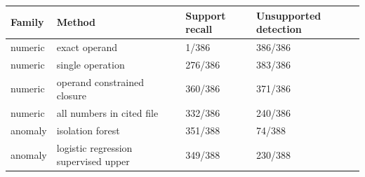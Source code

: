 \begin{tabular}{llll}
\toprule
Family & Method & Support recall & Unsupported detection \\
\midrule
numeric & exact operand & 1/386 & 386/386 \\
numeric & single operation & 276/386 & 383/386 \\
numeric & operand constrained closure & 360/386 & 371/386 \\
numeric & all numbers in cited file & 332/386 & 240/386 \\
anomaly & isolation forest & 351/388 & 74/388 \\
anomaly & logistic regression supervised upper & 349/388 & 230/388 \\
\bottomrule
\end{tabular}
